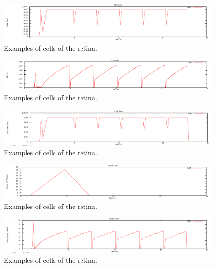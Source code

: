 \documentclass[12pt]{article}
\begin{document}
\begin{figure}[!ht]
\centering \includegraphics[bb= 0 0 1300 250, scale=.35]{figures/Test0_Tahoe/flow_rate.png}
\caption{Examples of cells of the retina.}
\label{fig:test0_tahoe_flow_rate}
\end{figure}

\begin{figure}[!ht]
\centering \includegraphics[bb= 0 0 1300 250, scale=.35]{figures/Test0_Tahoe/flow_rtt.png}
\caption{Examples of cells of the retina.}
\label{fig:test0_tahoe_flow_rtt}
\end{figure}

\begin{figure}[!ht]
\centering \includegraphics[bb= 0 0 1300 250, scale=.35]{figures/Test0_Tahoe/link_rate.png}
\caption{Examples of cells of the retina.}
\label{fig:test0_tahoe_link_rate}
\end{figure}

\begin{figure}[!ht]
\centering \includegraphics[bb= 0 0 1300 250, scale=.35]{figures/Test0_Tahoe/packet_loss.png}
\caption{Examples of cells of the retina.}
\label{fig:test0_tahoe_packet_loss}
\end{figure}

\begin{figure}[!ht]
\centering \includegraphics[bb= 0 0 1300 250, scale=.35]{figures/Test0_Tahoe/window_size.png}
\caption{Examples of cells of the retina.}
\label{fig:test0_tahoe_windnow_size}
\end{figure}
\end{document}
